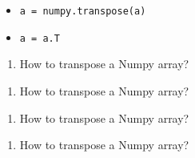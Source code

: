 \documentclass[12pt]{article}
\begin{document}
\begin{itemize}
    \item \texttt{a = numpy.transpose(a)}
    \item \texttt{a = a.T}
\end{itemize}

\begin{enumerate}[resume]
    \item How to transpose a Numpy array?
\end{enumerate}

\begin{enumerate}[resume]
    \item How to transpose a Numpy array?
\end{enumerate}

\begin{enumerate}[resume]
    \item How to transpose a Numpy array?
\end{enumerate}

\begin{enumerate}[resume]
    \item How to transpose a Numpy array?
\end{enumerate}
\end{document}
